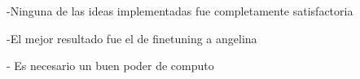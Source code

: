 \begin{conclusions}
    -Ninguna de las ideas implementadas fue completamente satisfactoria
    
    -El mejor resultado fue el de finetuning a angelina
    
    - Es necesario un buen poder de computo
    
   
\end{conclusions}
